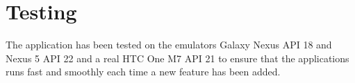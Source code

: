 \section{Testing}
The application has been tested on the emulators Galaxy Nexus API 18 and Nexus 5 API 22 and a real HTC One M7 API 21 to ensure that the applications runs fast and smoothly each time a new feature has been added.